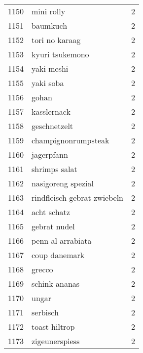 \begin{tabular}{llr}
1150 &                                         mini rolly &      2 \\
1151 &                                           baumkuch &      2 \\
1152 &                                     tori no karaag &      2 \\
1153 &                                    kyuri tsukemono &      2 \\
1154 &                                         yaki meshi &      2 \\
1155 &                                          yaki soba &      2 \\
1156 &                                              gohan &      2 \\
1157 &                                        kasslernack &      2 \\
1158 &                                       geschnetzelt &      2 \\
1159 &                                champignonrumpsteak &      2 \\
1160 &                                         jagerpfann &      2 \\
1161 &                                      shrimps salat &      2 \\
1162 &                                 nasigoreng spezial &      2 \\
1163 &                        rindfleisch gebrat zwiebeln &      2 \\
1164 &                                        acht schatz &      2 \\
1165 &                                       gebrat nudel &      2 \\
1166 &                                  penn al arrabiata &      2 \\
1167 &                                      coup danemark &      2 \\
1168 &                                             grecco &      2 \\
1169 &                                      schink ananas &      2 \\
1170 &                                              ungar &      2 \\
1171 &                                           serbisch &      2 \\
1172 &                                      toast hiltrop &      2 \\
1173 &                                     zigeunerspiess &      2 \\

\end{tabular}
